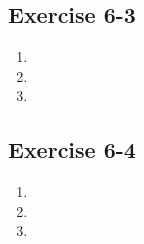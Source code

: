 \subsection{Exercise 6-3} %
    \begin{enumerate}[label=\textbf{\arabic*}.]
	\item %

	\item %

	\item %
    \end{enumerate}

\subsection{Exercise 6-4} %
    \begin{enumerate}[label=\textbf{\arabic*}.]
	\item %

	\item %

	\item %
    \end{enumerate}

